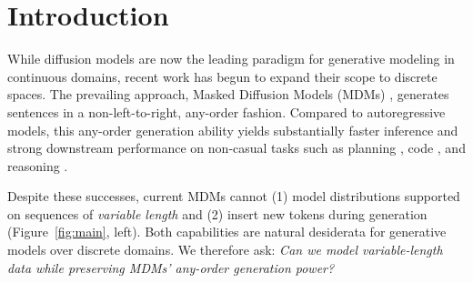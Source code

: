 \section{Introduction}
While diffusion models \citep{ho2020denoising,song2020score,sohl2015deep} are now the leading paradigm for generative modeling in continuous domains, recent work has begun to expand their scope to discrete spaces. The prevailing approach, Masked Diffusion Models (MDMs) \citep{shi2024simplified,sahoo2024simple,gat2024discrete}, generates sentences in a non-left-to-right, any-order fashion. Compared to autoregressive models, this any-order generation ability yields substantially faster inference and strong downstream performance on non-casual tasks such as planning \citep{ye2024beyond}, code \cite{nie2025large,dream2025}, and reasoning \citep{nie2024scaling}.

Despite these successes, current MDMs cannot (1) model distributions supported on sequences of \emph{variable length} and (2) insert new tokens during generation (Figure~\ref{fig:main}, left). Both capabilities are natural desiderata for generative models over discrete domains. We therefore ask: \emph{Can we model variable-length data while preserving MDMs' any-order generation power?}

